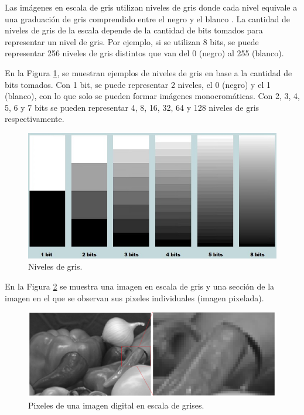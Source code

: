 Las imágenes en escala de gris utilizan niveles de gris donde cada nivel equivale a una graduación de gris comprendido entre el negro y el blanco \cite{russ2010}. La cantidad de niveles de gris de la escala depende de la cantidad de bits tomados para representar un nivel de gris. Por ejemplo, si se utilizan 8 bits, se puede representar 256 niveles de gris distintos que van del 0 (negro) al 255 (blanco).

En la Figura \ref{niveles_gris}, se muestran ejemplos de niveles de gris en base a la cantidad de bits tomados. Con 1 bit, se puede representar 2 niveles, el 0 (negro) y el 1 (blanco), con lo que solo se pueden formar imágenes monocromáticas. Con 2, 3, 4, 5, 6 y 7 bits se pueden representar 4, 8, 16, 32, 64 y 128 niveles de gris respectivamente.\break

\begin{figure}[H]
  \begin{center}
    \leavevmode
    \includegraphics[width=15cm] {niveles_gris.png}
    \caption{Niveles de gris.}
    \label{niveles_gris}
  \end{center}
\end{figure}

En la Figura \ref{imagen_pixelada} se muestra una imagen en escala de gris y una sección de la imagen en el que se observan sus pixeles individuales (imagen pixelada).

\begin{figure}[H]
  \begin{center}
    \leavevmode
    \includegraphics[width=14cm] {imagen_pixelada.png}
    \caption{Pixeles de una imagen digital en escala de grises.}
    \label{imagen_pixelada}
  \end{center}
\end{figure}


